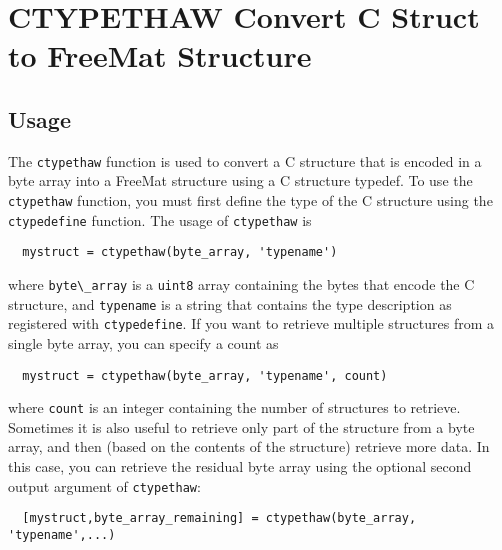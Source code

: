 \section{CTYPETHAW Convert C Struct to FreeMat Structure}

\subsection{Usage}

The \verb|ctypethaw| function is used to convert a C structure that is
encoded in a byte array into a FreeMat structure using a C structure
typedef.  To use the \verb|ctypethaw| function, you must first define
the type of the C structure using the \verb|ctypedefine| function.  The
usage of \verb|ctypethaw| is
\begin{verbatim}
  mystruct = ctypethaw(byte_array, 'typename')
\end{verbatim}
where \verb|byte\_array| is a \verb|uint8| array containing the bytes that encode
the C structure, and \verb|typename| is a string that contains the type
description as registered with \verb|ctypedefine|.  If you want to
retrieve multiple structures from a single byte array, you can specify
a count as
\begin{verbatim}
  mystruct = ctypethaw(byte_array, 'typename', count)
\end{verbatim}
where \verb|count| is an integer containing the number of structures to 
retrieve.  Sometimes it is also useful to retrieve only part of the
structure from a byte array, and then (based on the contents of the
structure) retrieve more data.  In this case, you can retrieve the
residual byte array using the optional second output argument of
\verb|ctypethaw|:
\begin{verbatim}
  [mystruct,byte_array_remaining] = ctypethaw(byte_array, 'typename',...)
\end{verbatim}
